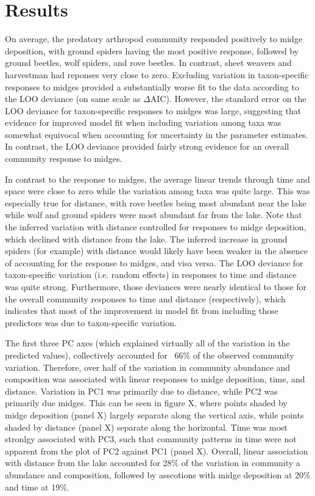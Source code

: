 

\section*{Results}

On average, the predatory arthropod community responded positively to midge deposition,
with ground spiders having the most positive
response, followed by ground beetles, wolf spiders, and rove beetles.
In contrast, sheet  weavers and harvestman had reponses very close to zero.
Excluding variation in taxon-specific responses to midges provided a substantially
worse fit to the data according to the LOO deviance (on same scale as $\Delta$AIC).
However, the standard error on the LOO deviance for taxon-specific responses to midges was
large, suggesting that evidence for improved model fit when including variation among
taxa was somewhat equivocal when accounting for uncertainty in the parameter estimates.
In contrast, the LOO deviance provided fairly strong evidence for an overall
community response to midges.

In contrast to the response to midges, the average linear trends through
time and space were close to zero while the variation among taxa was quite large.
This was especially true for distance, with rove beetles being most abundant near
the lake while wolf and ground spiders were most abundant far from the lake.
Note that the inferred variation with distance controlled for responses to midge
deposition, which declined with distance from the lake.
The inferred increase in ground spiders (for example) with distance
would likely have been weaker in the absence of accounting for the response to midges,
and visa versa.
The LOO deviance for taxon-specific variation (i.e. random effects) in responses to time
and distance was quite strong.
Furthermore, those deviances were nearly identical to those for the overall community
responses to time and distance (respectively), which indicates that most of the
improvement in model fit from including those predictors was due to taxon-specific
variation.

The first three PC axes (which explained virtually all of the variation in the
predicted values), collectively accounted for ~66\% of the observed community variation.
Therefore, over half of the variation in community abundance and composition was
associated with linear responses to midge deposition, time, and distance.
Variation in PC1 was primarily due to distance, while PC2 was primarily due midges.
This can be seen in figure X, where points shaded by midge deposition (panel X)
largely separate along the vertical axis, while points shaded by distance (panel X)
separate along the horizontal.
Time was most stronlgy associated with PC3, such that community patterns in time were
not apparent from the plot of PC2 against PC1 (panel X).
Overall, linear association with distance from the lake accounted for
28\% of the variation in community a abundance and composition,
followed by asscotions with midge deposition at 20\% and time at 19\%.

